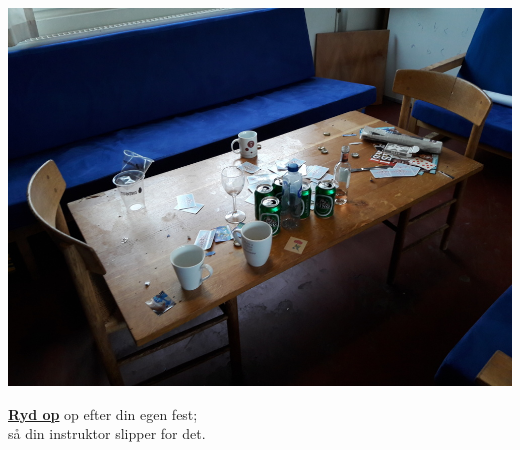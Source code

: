 \documentclass{article}
\begin{document}
\maketitle

\null
\vspace{-1.5cm}


\vspace{0.1in}

\begin{center}

\includegraphics[scale=0.4]{billeder/beskidt-hyggehjoerne.jpg}

\end{center}

\vspace{0.2in}

\begin{center}

{\fontsize{30}{40}\selectfont \textbf{\underline{Ryd op}} op efter din egen
fest;\\ \vspace{0.1in} så din instruktor slipper for det.}

\end{center}

\dansk

\underskriv
\end{document}
